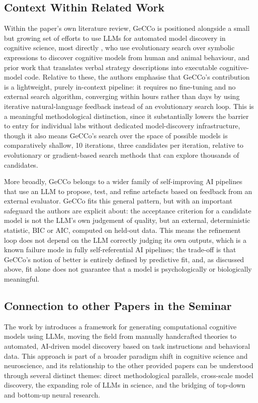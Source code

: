 \subsection*{Context Within Related Work}
Within the paper's own literature review, GeCCo is positioned alongside a small but growing set of efforts to use LLMs for automated model discovery in cognitive science, most directly \citet{castro2025discovering}, who use evolutionary search over symbolic expressions to discover cognitive models from human and animal behaviour, and prior work that translates verbal strategy descriptions into executable cognitive-model code. Relative to these, the authors emphasise that GeCCo's contribution is a lightweight, purely in-context pipeline: it requires no fine-tuning and no external search algorithm, converging within hours rather than days by using iterative natural-language feedback instead of an evolutionary search loop. This is a meaningful methodological distinction, since it substantially lowers the barrier to entry for individual labs without dedicated model-discovery infrastructure, though it also means GeCCo's search over the space of possible models is comparatively shallow, 10 iterations, three candidates per iteration, relative to evolutionary or gradient-based search methods that can explore thousands of candidates.

More broadly, GeCCo belongs to a wider family of self-improving AI pipelines that use an LLM to propose, test, and refine artefacts based on feedback from an external evaluator. GeCCo fits this general pattern, but with an important safeguard the authors are explicit about: the acceptance criterion for a candidate model is not the LLM's own judgement of quality, but an external, deterministic statistic, BIC or AIC, computed on held-out data. This means the refinement loop does not depend on the LLM correctly judging its own outputs, which is a known failure mode in fully self-referential AI pipelines; the trade-off is that GeCCo's notion of better is entirely defined by predictive fit, and, as discussed above, fit alone does not guarantee that a model is psychologically or biologically meaningful.

\subsection{Connection to other Papers in the Seminar}
The work by \citet{rmus2025generating} introduces a framework for generating computational cognitive models using LLMs, moving the field from manually handcrafted theories to automated, AI-driven model discovery based on task instructions and behavioral data. This approach is part of a broader paradigm shift in cognitive science and neuroscience, and its relationship to the other provided papers can be understood through several distinct themes: direct methodological parallels, cross-scale model discovery, the expanding role of LLMs in science, and the bridging of top-down and bottom-up neural research.

